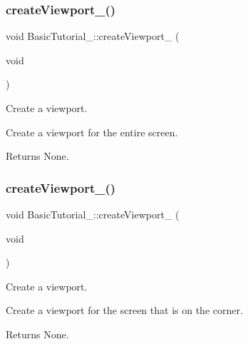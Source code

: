 \subsubsection{\texorpdfstring{create\+Viewport\+\_()}{createViewport\_00()}}
{\footnotesize\ttfamily void Basic\+Tutorial\+\_\+::create\+Viewport\+\_ (\begin{DoxyParamCaption}\item[{void}]{ }\end{DoxyParamCaption})\hspace{0.3cm}{\ttfamily [protected]}}



Create a viewport. 

Create a viewport for the entire screen.

\begin{DoxyReturn}{Returns}
None. 
\end{DoxyReturn}
\mbox{\label{class_basic_tutorial__00_a2801a2f0d91d80b471da48344d2ccccf}} 
\subsubsection{\texorpdfstring{create\+Viewport\+\_()}{createViewport\_01()}}
{\footnotesize\ttfamily void Basic\+Tutorial\+\_\+::create\+Viewport\+\_ (\begin{DoxyParamCaption}\item[{void}]{ }\end{DoxyParamCaption})\hspace{0.3cm}{\ttfamily [protected]}}



Create a viewport. 

Create a viewport for the screen that is on the corner.

\begin{DoxyReturn}{Returns}
None. 
\end{DoxyReturn}
\mbox{\label{class_basic_tutorial__00_adc2454d9f8226e0958ecf702f355846e}} 
